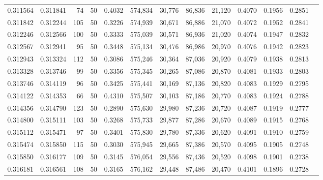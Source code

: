 \begin{tabular}{rrrrrrrrrrrrr}
0.311564 & 0.311841 &    74 &  50 &                                     0.4032 & 574,834 &  30,776 &  86,836 &  21,120 & 0.4070 & 0.1956 & 0.2851 \\
0.311842 & 0.312244 &   105 &  50 &                                     0.3226 & 574,939 &  30,671 &  86,886 &  21,070 & 0.4072 & 0.1952 & 0.2841 \\
0.312246 & 0.312566 &   100 &  50 &                                     0.3333 & 575,039 &  30,571 &  86,936 &  21,020 & 0.4074 & 0.1947 & 0.2832 \\
0.312567 & 0.312941 &    95 &  50 &                                     0.3448 & 575,134 &  30,476 &  86,986 &  20,970 & 0.4076 & 0.1942 & 0.2823 \\
0.312943 & 0.313324 &   112 &  50 &                                     0.3086 & 575,246 &  30,364 &  87,036 &  20,920 & 0.4079 & 0.1938 & 0.2813 \\
0.313328 & 0.313746 &    99 &  50 &                                     0.3356 & 575,345 &  30,265 &  87,086 &  20,870 & 0.4081 & 0.1933 & 0.2803 \\
0.313746 & 0.314119 &    96 &  50 &                                     0.3425 & 575,441 &  30,169 &  87,136 &  20,820 & 0.4083 & 0.1929 & 0.2795 \\
0.314122 & 0.314353 &    66 &  50 &                                     0.4310 & 575,507 &  30,103 &  87,186 &  20,770 & 0.4083 & 0.1924 & 0.2788 \\
0.314356 & 0.314790 &   123 &  50 &                                     0.2890 & 575,630 &  29,980 &  87,236 &  20,720 & 0.4087 & 0.1919 & 0.2777 \\
0.314800 & 0.315111 &   103 &  50 &                                     0.3268 & 575,733 &  29,877 &  87,286 &  20,670 & 0.4089 & 0.1915 & 0.2768 \\
0.315112 & 0.315471 &    97 &  50 &                                     0.3401 & 575,830 &  29,780 &  87,336 &  20,620 & 0.4091 & 0.1910 & 0.2759 \\
0.315474 & 0.315850 &   115 &  50 &                                     0.3030 & 575,945 &  29,665 &  87,386 &  20,570 & 0.4095 & 0.1905 & 0.2748 \\
0.315850 & 0.316177 &   109 &  50 &                                     0.3145 & 576,054 &  29,556 &  87,436 &  20,520 & 0.4098 & 0.1901 & 0.2738 \\
0.316181 & 0.316561 &   108 &  50 &                                     0.3165 & 576,162 &  29,448 &  87,486 &  20,470 & 0.4101 & 0.1896 & 0.2728 \\

\end{tabular}
